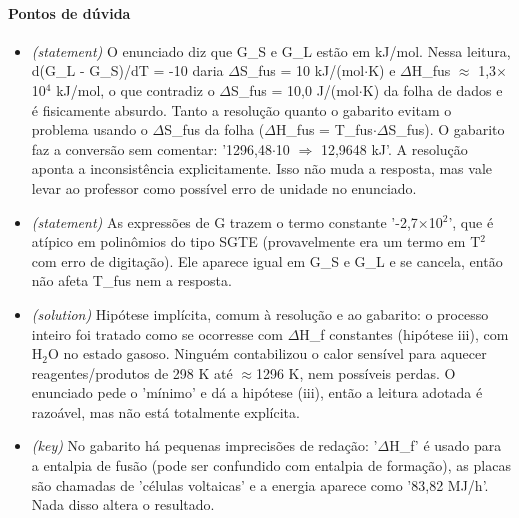 \documentclass{article}%
\begin{document}
\paragraph{Pontos de dúvida}%
\begin{itemize}%
\item%
\textit{(statement)} O enunciado diz que G\_S e G\_L estão em kJ/mol. Nessa leitura, d(G\_L - G\_S)/dT = -10 daria $\Delta$S\_fus = 10 kJ/(mol$\cdot$K) e $\Delta$H\_fus $\approx$ 1,3$\times$10$^{4}$ kJ/mol, o que contradiz o $\Delta$S\_fus = 10,0 J/(mol$\cdot$K) da folha de dados e é fisicamente absurdo. Tanto a resolução quanto o gabarito evitam o problema usando o $\Delta$S\_fus da folha ($\Delta$H\_fus = T\_fus$\cdot$$\Delta$S\_fus). O gabarito faz a conversão sem comentar: '1296,48$\cdot$10 $\Rightarrow$ 12,9648 kJ'. A resolução aponta a inconsistência explicitamente. Isso não muda a resposta, mas vale levar ao professor como possível erro de unidade no enunciado.%
\item%
\textit{(statement)} As expressões de G trazem o termo constante '-2,7$\times$10$^2$', que é atípico em polinômios do tipo SGTE (provavelmente era um termo em T$^2$ com erro de digitação). Ele aparece igual em G\_S e G\_L e se cancela, então não afeta T\_fus nem a resposta.%
\item%
\textit{(solution)} Hipótese implícita, comum à resolução e ao gabarito: o processo inteiro foi tratado como se ocorresse com $\Delta$H\_f constantes (hipótese iii), com H$_{2}$O no estado gasoso. Ninguém contabilizou o calor sensível para aquecer reagentes/produtos de 298 K até $\approx$1296 K, nem possíveis perdas. O enunciado pede o 'mínimo' e dá a hipótese (iii), então a leitura adotada é razoável, mas não está totalmente explícita.%
\item%
\textit{(key)} No gabarito há pequenas imprecisões de redação: '$\Delta$H\_f' é usado para a entalpia de fusão (pode ser confundido com entalpia de formação), as placas são chamadas de 'células voltaicas' e a energia aparece como '83,82 MJ/h'. Nada disso altera o resultado.%
\end{itemize}%
\end{document}
